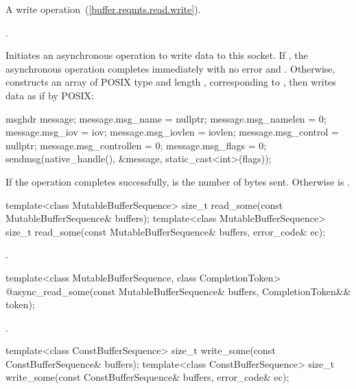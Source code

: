 \begin{itemdescr}
\pnum
A write operation~(\ref{buffer.reqmts.read.write}).

\pnum
\completionsig {}.

\pnum
\effects Initiates an asynchronous operation to write data to this socket. If , the asynchronous operation completes immediately with no error and . Otherwise, constructs an array  of POSIX type  and length , corresponding to , then writes data as if by POSIX: 
\begin{codeblock}
msghdr message;
message.msg_name = nullptr;
message.msg_namelen = 0;
message.msg_iov = iov;
message.msg_iovlen = iovlen;
message.msg_control = nullptr;
message.msg_controllen = 0;
message.msg_flags = 0;
sendmsg(native_handle(), &message, static_cast<int>(flags));
\end{codeblock}


\pnum
If the operation completes successfully,  is the number of bytes sent. Otherwise  is .
\end{itemdescr}

\begin{itemdecl}
template<class MutableBufferSequence>
  size_t read_some(const MutableBufferSequence& buffers);
template<class MutableBufferSequence>
  size_t read_some(const MutableBufferSequence& buffers,
                   error_code& ec);
\end{itemdecl}

\begin{itemdescr}
\pnum
\returns {}.
\end{itemdescr}

\begin{itemdecl}
template<class MutableBufferSequence, class CompletionToken>
  @\DEDUCED@ async_read_some(const MutableBufferSequence& buffers,
                          CompletionToken&& token);
\end{itemdecl}

\begin{itemdescr}
\pnum
\returns {}.
\end{itemdescr}

\begin{itemdecl}
template<class ConstBufferSequence>
  size_t write_some(const ConstBufferSequence& buffers);
template<class ConstBufferSequence>
  size_t write_some(const ConstBufferSequence& buffers,
                    error_code& ec);
\end{itemdecl}

